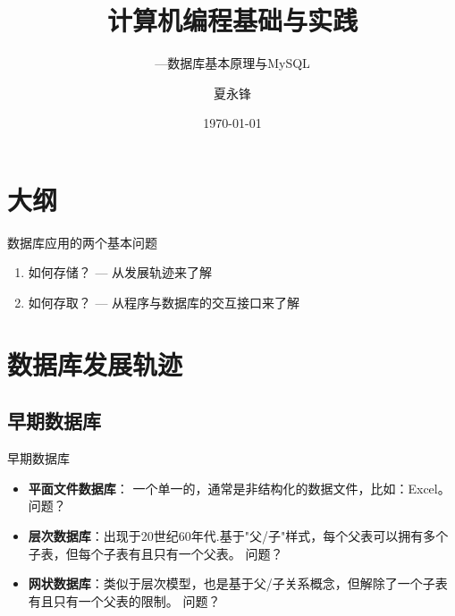 \documentclass[CJK]{beamer}
\begin{document}
\begin{CJK*}{UTF8}{gbsn}

\title{计算机编程基础与实践}
\subtitle{---数据库基本原理与MySQL}
\author{夏永锋}

\date{\today}

\begin{frame}
	\titlepage
\end{frame}

\section*{大纲}
\begin{frame}
    \tableofcontents
\end{frame}

\begin{frame}{数据库应用的两个基本问题}
	\begin{enumerate}
		\item 如何存储？  --- 从发展轨迹来了解
		\item 如何存取？  --- 从程序与数据库的交互接口来了解
	\end{enumerate}
\end{frame}

\section{数据库发展轨迹}
\subsection{早期数据库}
\begin{frame}{早期数据库}
	\begin{block}{}
		\begin{itemize}
		\item {\bf 平面文件数据库}： 一个单一的，通常是非结构化的数据文件，比如：Excel。 {\color{red} 问题？} 
		\item {\bf 层次数据库}：出现于20世纪60年代.基于"父/子"样式，每个父表可以拥有多个子表，但每个子表有且只有一个父表。{\color{red} 问题？}
		\item {\bf 网状数据库}：类似于层次模型，也是基于父/子关系概念，但解除了一个子表有且只有一个父表的限制。{\color{red} 问题？}
		\end{itemize}
	\end{block}
\end{frame}


\end{CJK*}
\end{document}
